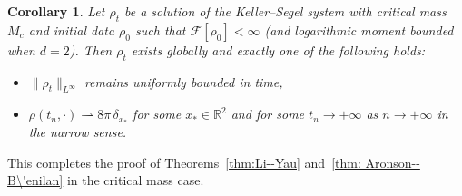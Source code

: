 \documentclass[11pt,a4paper]{article}
\numberwithin{equation}{section}
\newcommand{\R}{{\mathbb{R}}}
\theoremstyle{plain}
\newtheorem{proposition}[theorem]{Proposition}
\newtheorem{corollary}[theorem]{Corollary}
\theoremstyle{remark}
\begin{document}
\begin{corollary}\label{cor:critical_mass_global_2D}
Let $\rho_t$ be a solution of the Keller--Segel system with critical mass $M_c$ and initial data $\rho_0$ such that $\mathcal{F}[\rho_0]<\infty$ (and logarithmic moment bounded when $d=2$). Then $\rho_t$ exists globally and exactly one of the following holds:
\begin{itemize}
\item $\|\rho_t\|_{L^\infty}$ remains uniformly bounded in time,
\item $\rho(t_n,\cdot)\rightharpoonup 8\pi\,\delta_{x_*}$ for some $x_*\in \R^2$ and for some $t_n\to +\infty$ as $n\to+\infty$ in the narrow sense.
\end{itemize}
\end{corollary}

\fi

This completes the proof of Theorems~\ref{thm:Li--Yau} and~\ref{thm: Aronson--B\'enilan} in the critical mass case. 





\end{document}
